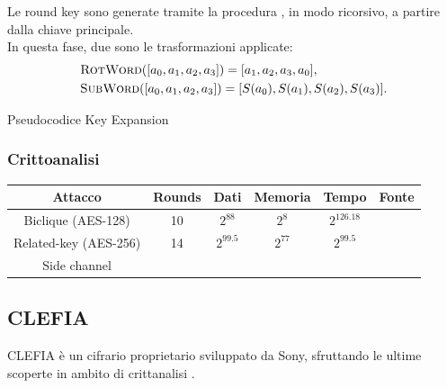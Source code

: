 \documentclass[target=bach,aauheader=,style=]{thud}
\begin{document}
			Le round key sono generate tramite la procedura , in modo ricorsivo, a partire dalla chiave principale.\\
			In questa fase, due sono le trasformazioni applicate:
			\begin{align*}
			&\Call{RotWord}{[a_0,a_1,a_2,a_3]} = [a_1,a_2,a_3,a_0],\\
			&\Call{SubWord}{[a_0,a_1,a_2,a_3]} = [S(a_0),S(a_1), S(a_2), S(a_3)].
			\end{align*}

			\begin{algorithm}
				\caption{Pseudocodice Key Expansion}
				\begin{algorithmic}
						\EndWhile
							\EndIf
						\EndWhile
					\EndProcedure
				\end{algorithmic}
			\end{algorithm}

			\subsubsection{Crittoanalisi}
			\begin{center}
				\begin{tabular}{ |c|c|c|c|c|c| } 
					\hline
					Attacco & Rounds & Dati & Memoria & Tempo & Fonte \\ 
					\hline
					\hline
					Biclique (AES-128) & 10 & $2^{88}$ & $2^8$ & $2^{126.18}$ & \cite{aes_biclique} \\ 
					\hline
					Related-key (AES-256) & 14 & $2^{99.5}$ & $2^{77}$ & $2^{99.5}$ & \cite{aes_relatedkey}\\ 
					\hline
					Side channel & & & & & \cite{aesside, aesfault}\\
					\hline
				\end{tabular}
			\end{center}
		\subsection{CLEFIA}
		CLEFIA è un cifrario proprietario sviluppato da Sony, sfruttando le ultime scoperte in ambito di crittanalisi \cite{clefia}.
\end{document}
